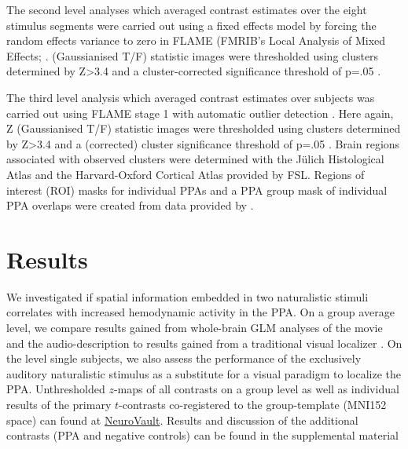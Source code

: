 \documentclass[english]{article}
\begin{document}
The second level analyses which averaged contrast estimates over the eight
stimulus segments were carried out using a fixed effects model by forcing the
random effects variance to zero in FLAME (FMRIB's Local Analysis of Mixed
Effects; \citep{beckmann2003general, woolrich2004multilevel}.
(Gaussianised T/F) statistic images were thresholded using clusters determined
by Z>3.4 and a cluster-corrected significance threshold of p=.05
\citep{worsley2001statistical}.

The third level analysis which averaged contrast estimates over subjects was
carried out using FLAME stage 1 with automatic outlier detection
\citep{beckmann2003general, woolrich2004multilevel, woolrich2008robust}.
Here again, Z (Gaussianised T/F) statistic images were thresholded using
clusters determined by Z>3.4 and a (corrected) cluster significance threshold of
p=.05 \citep{worsley2001statistical}.
Brain regions associated with observed clusters were determined with the Jülich
Histological Atlas \citep{eickhoff2005toolbox, eickhoff2007assignment} and the
Harvard-Oxford Cortical Atlas \citep{desikan2006automated} provided by FSL.
Regions of interest (ROI) masks for individual PPAs and a PPA group mask of
individual PPA overlaps were created from data provided by
\citep{sengupta2016extension}.


\section{Results}


We investigated if spatial information embedded in two naturalistic stimuli
correlates with increased hemodynamic activity in the PPA.
On a group average level, we compare results gained from whole-brain GLM
analyses of the movie and the audio-description to results gained from a
traditional visual localizer \citep{sengupta2016extension}.
On the level single subjects, we also assess the performance of the exclusively
auditory naturalistic stimulus as a substitute for a visual paradigm to localize
the PPA.
Unthresholded $z$-maps of all contrasts on a group level as well as individual
results of the primary $t$-contrasts co-registered to the group-template (MNI152
space) can found at
\href{https://neurovault.org/collections/KADGMGVZ/}{NeuroVault}.
Results and discussion of the additional contrasts (PPA and negative controls)
can be found in the supplemental material
\end{document}
